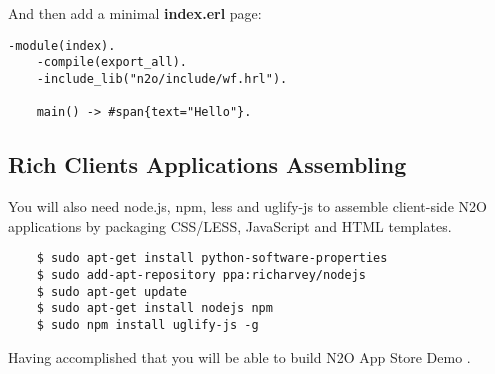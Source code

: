 And then add a minimal {\bf index.erl} page:

\begin{lstlisting}[caption=index.erl]
    -module(index).
    -compile(export_all).
    -include_lib("n2o/include/wf.hrl").

    main() -> #span{text="Hello"}.
\end{lstlisting}

\subsection{Rich Clients Applications Assembling}
You will also need node.js, npm, less and uglify-js to assemble
client-side N2O applications by packaging CSS/LESS, JavaScript and HTML templates.

\vspace{1\baselineskip}
\begin{lstlisting}
    $ sudo apt-get install python-software-properties
    $ sudo add-apt-repository ppa:richarvey/nodejs
    $ sudo apt-get update
    $ sudo apt-get install nodejs npm
    $ sudo npm install uglify-js -g
\end{lstlisting}
\vspace{1\baselineskip}

Having accomplished that you will be able to build N2O App Store
Demo .
